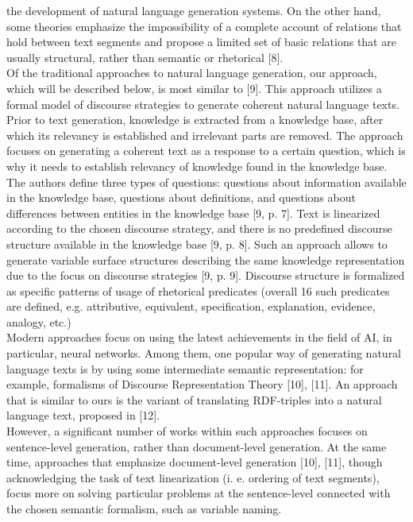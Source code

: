 \documentclass{scndocument}
\begin{document}
\begin{SCn}
\begin{multicols}{2}
\begin{justify}
the development of natural language generation systems.
On the other hand, some theories emphasize the impossibility of a complete account of relations that hold
between text segments and propose a limited set of basic
relations that are usually structural, rather than semantic
or rhetorical [8].\\
Of the traditional approaches to natural language generation, our approach, which will be described below,
is most similar to [9]. This approach utilizes a formal
model of discourse strategies to generate coherent natural
language texts. Prior to text generation, knowledge is
extracted from a knowledge base, after which its relevancy is established and irrelevant parts are removed.
The approach focuses on generating a coherent text as
a response to a certain question, which is why it needs
to establish relevancy of knowledge found in the knowledge base. The authors define three types of questions:
questions about information available in the knowledge
base, questions about definitions, and questions about
differences between entities in the knowledge base [9,
p. 7]. Text is linearized according to the chosen discourse
strategy, and there is no predefined discourse structure
available in the knowledge base [9, p. 8]. Such an
approach allows to generate variable surface structures
describing the same knowledge representation due to the
focus on discourse strategies [9, p. 9]. Discourse structure
is formalized as specific patterns of usage of rhetorical
predicates (overall 16 such predicates are defined, e.g. attributive, equivalent, specification, explanation, evidence,
analogy, etc.)\\ 
Modern approaches focus on using the latest achievements in the field of AI, in particular, neural networks.
Among them, one popular way of generating natural
language texts is by using some intermediate semantic
representation: for example, formalisms of Discourse
Representation Theory [10], [11]. An approach that is
similar to ours is the variant of translating RDF-triples
into a natural language text, proposed in [12].\\ 
However, a significant number of works within such
approaches focuses on sentence-level generation, rather
than document-level generation. At the same time, approaches that emphasize document-level generation [10],
[11], though acknowledging the task of text linearization
(i. e. ordering of text segments), focus more on solving
particular problems at the sentence-level connected with
the chosen semantic formalism, such as variable naming.\\ 

\end{justify}
\end{multicols}
\end{SCn}
\end{document}
